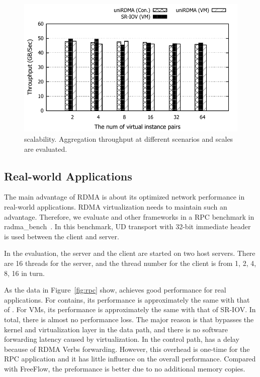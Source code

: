 \begin{figure}[!ht]
	\centering
	\includegraphics[width=1.0\linewidth]{images/scabality.pdf}
	\caption{\sys scalability. Aggregation throughput at different scenarios and scales are evaluated.}
	\label{fig:scabality}
\end{figure}

\subsection{Real-world Applications}

The main advantage of RDMA is about its optimized network performance in real-world applications. RDMA virtualization needs to maintain such an advantage. Therefore, we evaluate \sys and other frameworks in a RPC benchmark in radma\_bench~\cite{rbench}. In this benchmark, UD transport with 32-bit immediate header is used between the client and server.

In the evaluation, the server and the client are started on two host servers. There are 16 threads for the server, and the thread number for the client is from 1, 2, 4, 8, 16 in turn. %

As the data in Figure~\ref{fig:rpc} show, \sys achieves good performance for real applications. For contains, its performance is approximately the same with that of \native. For VMs, its performance is approximately the same with that of SR-IOV. In total, there is almost no performance loss. The major reason is that \sys bypasses the kernel and virtualization layer in the data path, and there is no software forwarding latency caused by virtualization. In the control path, \sys has a delay because of RDMA Verbs forwarding. However, this overhead is one-time for the RPC application and it has little influence on the overall performance. Compared with FreeFlow, the preformance \sys is better due to no additional memory copies. 

